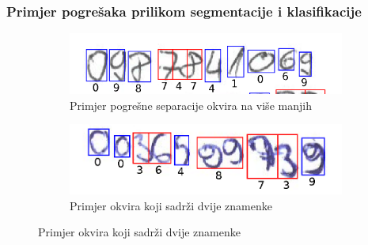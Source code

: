 \documentclass{beamer}
\begin{document}
\begin{frame}
	\frametitle{Primjer pogrešaka prilikom segmentacije i klasifikacije}
	\begin{figure}
		\begin{subfigure}[t]{.4\textwidth}
			\centering
			\includegraphics[width=\linewidth]{error_2.png}
			\caption{Primjer pogrešne separacije okvira na više manjih}
			\label{error1}
		\end{subfigure}
		\hfill
		\begin{subfigure}[t]{.4\textwidth}
			\centering
			\includegraphics[width=\linewidth]{postprocesor.png}
			\caption{Primjer okvira koji sadrži dvije znamenke}
			\label{error2}
		\end{subfigure}
		
		\medskip
		

\end{figure}
\end{frame}
\end{document}
